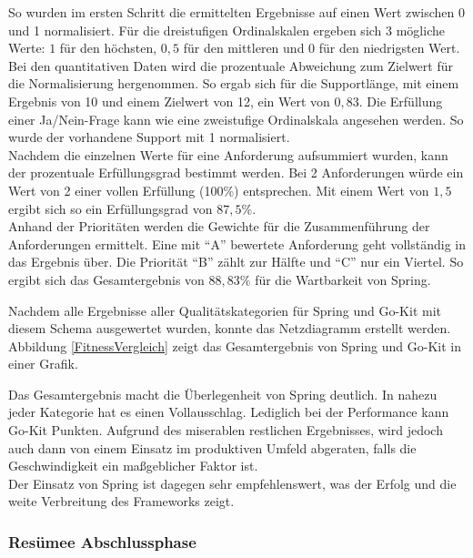 So wurden im ersten Schritt die ermittelten Ergebnisse auf einen Wert zwischen 0 und 1 normalisiert. Für die dreistufigen Ordinalskalen ergeben sich 3 mögliche Werte: $1$ für den höchsten, $0,5$ für den mittleren und $0$ für den niedrigsten Wert.\\
Bei den quantitativen Daten wird die prozentuale Abweichung zum Zielwert für die Normalisierung hergenommen. So ergab sich für die Supportlänge, mit einem Ergebnis von 10 und einem Zielwert von 12, ein Wert von $0,83$.
Die Erfüllung einer Ja/Nein-Frage kann wie eine zweistufige Ordinalskala angesehen werden. So wurde der vorhandene Support mit 1 normalisiert.\\
Nachdem die einzelnen Werte für eine Anforderung aufsummiert wurden, kann der prozentuale Erfüllungsgrad bestimmt werden. Bei 2 Anforderungen würde ein Wert von 2 einer vollen Erfüllung (100\%) entsprechen. Mit einem Wert von $1,5$ ergibt sich so ein Erfüllungsgrad von $87,5\%$.\\
Anhand der Prioritäten werden die Gewichte für die Zusammenführung der Anforderungen ermittelt. Eine mit \enquote{A} bewertete Anforderung geht vollständig in das Ergebnis über. Die Priorität \enquote{B} zählt zur Hälfte und \enquote{C} nur ein Viertel. So ergibt sich das Gesamtergebnis von $88,83\%$ für die Wartbarkeit von Spring.

Nachdem alle Ergebnisse aller Qualitätskategorien für Spring und Go-Kit mit diesem Schema ausgewertet wurden, konnte das Netzdiagramm erstellt werden. Abbildung \ref{FitnessVergleich} zeigt das Gesamtergebnis von Spring und Go-Kit in einer Grafik. 

  
Das Gesamtergebnis macht die Überlegenheit von Spring deutlich. In nahezu jeder Kategorie hat es einen Vollausschlag. Lediglich bei der Performance kann Go-Kit Punkten. Aufgrund des miserablen restlichen Ergebnisses, wird jedoch auch dann von einem Einsatz im produktiven Umfeld abgeraten, falls die Geschwindigkeit ein maßgeblicher Faktor ist.\\
Der Einsatz von Spring ist dagegen sehr empfehlenswert, was der Erfolg und die weite Verbreitung des Frameworks zeigt.   

\subsubsection{Resümee Abschlussphase}

